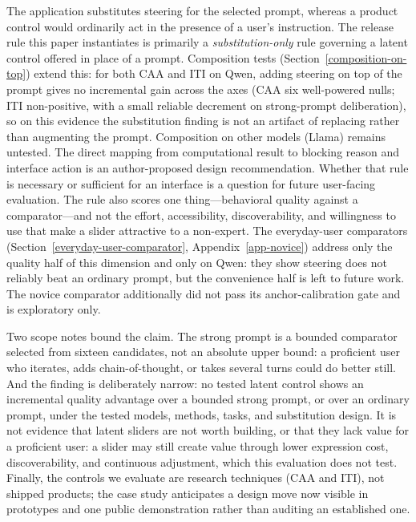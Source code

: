 \documentclass[manuscript,review,anonymous]{acmart}
\begin{document}
The application substitutes steering for the selected prompt, whereas a product control would ordinarily act in the presence of a user's instruction. {}%
The release rule this paper instantiates is primarily a \emph{substitution-only} rule governing a latent control offered in place of a prompt. Composition tests (Section~\ref{composition-on-top}) extend this: for both CAA and ITI on Qwen, adding steering on top of the prompt gives no incremental gain across the axes (CAA six well-powered nulls; ITI non-positive, with a small reliable decrement on strong-prompt deliberation), so on this evidence the substitution finding is not an artifact of replacing rather than augmenting the prompt. Composition on other models (Llama) remains untested. {}%
{}%
The direct mapping from computational result to blocking reason and interface action is an author-proposed design recommendation. Whether that rule is necessary or sufficient for an interface is a question for future user-facing evaluation. {}%
{}%
The rule also scores one thing---behavioral quality against a comparator---and not the effort, accessibility, discoverability, and willingness to use that make a slider attractive to a non-expert. The everyday-user comparators (Section~\ref{everyday-user-comparator}, Appendix~\ref{app-novice}) address only the quality half of this dimension and only on Qwen: they show steering does not reliably beat an ordinary prompt, but the convenience half is left to future work. The novice comparator additionally did not pass its anchor-calibration gate and is exploratory only.

Two scope notes bound the claim. The strong prompt is a bounded comparator selected from sixteen candidates, not an absolute upper bound: a proficient user who iterates, adds chain-of-thought, or takes several turns could do better still. And the finding is deliberately narrow: no tested latent control shows an incremental quality advantage over a bounded strong prompt, or over an ordinary prompt, under the tested models, methods, tasks, and substitution design. It is not evidence that latent sliders are not worth building, or that they lack value for a proficient user: a slider may still create value through lower expression cost, discoverability, and continuous adjustment, which this evaluation does not test. Finally, the controls we evaluate are research techniques (CAA and ITI), not shipped products; the case study anticipates a design move now visible in prototypes and one public demonstration rather than auditing an established one.
\end{document}
